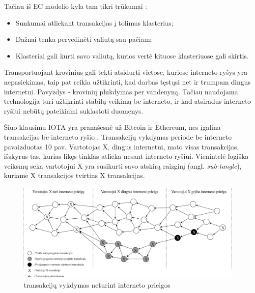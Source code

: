 Tačiau iš EC modelio kyla tam tikri trūkumai \cite{sergey2018economic}: 
\begin{itemize}
    \item Sunkumai atliekant transakcijas į tolimus klasterius;
    \item Dažnai tenka pervedinėti valiutą sau pačiam;
    \item Klasteriai gali kurti savo valiutą, kurios vertė kituose klasteriuose gali skirtis.
\end{itemize} 





Transportuojant krovinius gali tekti atsidurti vietose, kuriose interneto ryšys yra nepasiekimas, taip pat reikia užtikrinti, kad darbas tęstųsi net ir trumpam dingus internetui. Pavyzdys - krovinių plukdymas per vandenyną. Tačiau naudojama technologija turi užtikrinti stabilų veikimą be interneto, ir kad atsiradus interneto ryšiui nebūtų pateikiami suklastoti duomenys.

Šiuo klausimu IOTA yra pranašesnė už Bitcoin ir Ethereum, nes įgalina transakcijas be interneto ryšio \cite{zivic2019distributed}. Transakcijų vykdymas periode be interneto pavaizduotas 10 pav. Vartotojas X, dingus internetui, mato visas transakcijas, išskyrus tas, kurias likęs tinklas atlieka nesant interneto ryšiui. Vienintelė logiška veiksmų seka vartotojui X yra susikurti savo atskirą raizginį (angl. \textit{sub-tangle}), kuriame X transakcijos tvirtins X transakcijas.

\begin{figure}[H]
    \centering
    \includegraphics[scale=0.6]{images/offline-tangle}
    \caption{transakcijų vykdymas neturint interneto prieigos}
\end{figure}

